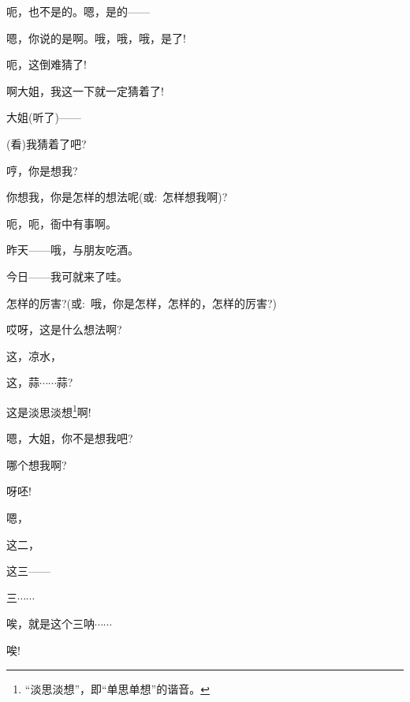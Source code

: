 {{呃，也不是的。嗯，是的------}


{嗯，你说的是啊。哦，哦，哦，是了!}


{呃，这倒难猜了!}


{啊大姐，我这一下就一定猜着了!}

{大姐(听了)------}


{(看)我猜着了吧?}

{哼，你是想我?}

{你想我，你是怎样的想法呢(或:~怎样想我啊)?}

{呃，呃，衙中有事啊。}

{昨天------哦，与朋友吃酒。}

{今日------我可就来了哇。}

{怎样的厉害?(或:~哦，你是怎样，怎样的，怎样的厉害?)}

{哎呀，这是什么想法啊?}

{这，凉水，}

{这，蒜$\cdots{}\cdots{}$蒜?}

{这是淡思淡想}\footnote{``淡思淡想''，即``单思单想''的谐音。}{啊!}

{嗯，大姐，你不是想我吧?}

{哪个想我啊?}

{呀呸!}\hspace{20pt}~


{嗯，}\hspace{30pt}~

{这二，}

{这三------}\hspace{10pt}~

{三$\cdots{}\cdots{}$}

{唉，就是这个三呐$\cdots{}\cdots{}$}


{唉!}\hspace{30pt}~

}
